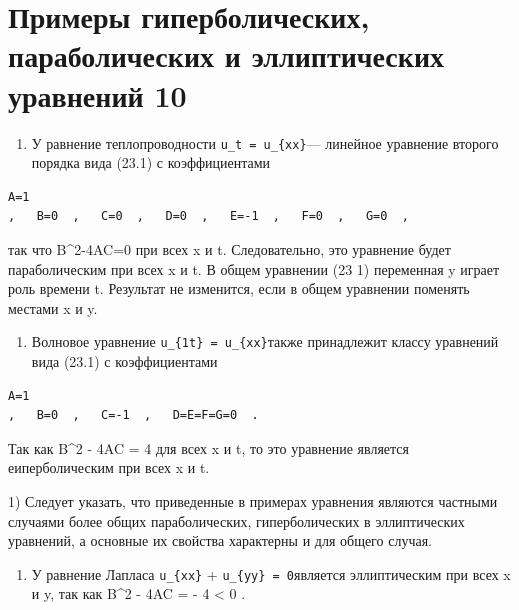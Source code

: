 \documentclass[
  ukrainian,
]{article}
\providecommand{\tightlist}{%
  \setlength{\itemsep}{0pt}\setlength{\parskip}{0pt}}
\begin{document}
\section{Примеры гиперболических, параболических и эллиптических
уравнений
10}\label{ux43fux440ux438ux43cux435ux440ux44b-ux433ux438ux43fux435ux440ux431ux43eux43bux438ux447ux435ux441ux43aux438ux445-ux43fux430ux440ux430ux431ux43eux43bux438ux447ux435ux441ux43aux438ux445-ux438-ux44dux43bux43bux438ux43fux442ux438ux447ux435ux441ux43aux438ux445-ux443ux440ux430ux432ux43dux435ux43dux438ux439-10}

\begin{enumerate}
\def\labelenumi{\arabic{enumi}.}
\tightlist
\item
  У равнение теплопроводности \texttt{u\_t\ =\ u\_\{xx\}}--- линейное
  уравнение второго порядка вида (23.1) с коэффициентами
\end{enumerate}

\begin{verbatim}
A=1
,   B=0  ,   C=0  ,   D=0  ,   E=-1  ,   F=0  ,   G=0  ,
\end{verbatim}

так что B\^{}2-4AC=0 при всех x и t. Следовательно, это уравнение будет
параболическим при всех x и t. В общем уравнении (23 1) переменная y
играет роль времени t. Результат не изменится, если в общем уравнении
поменять местами x и y.

\begin{enumerate}
\def\labelenumi{\arabic{enumi}.}
\setcounter{enumi}{1}
\tightlist
\item
  Волновое уравнение \texttt{u\_\{1t\}\ =\ u\_\{xx\}}также принадлежит
  классу уравнений вида (23.1) с коэффициентами
\end{enumerate}

\begin{verbatim}
A=1
,   B=0  ,   C=-1  ,   D=E=F=G=0  .
\end{verbatim}

Так как B\^{}2 - 4AC = 4 для всех x и t, то это уравнение является
еиперболическим при всех x и t.

1) Следует указать, что приведенные в примерах уравнения являются
частными случаями более общих параболических, гиперболических в
эллиптических уравнений, а основные их свойства характерны и для общего
случая.

\begin{enumerate}
\def\labelenumi{\arabic{enumi}.}
\setcounter{enumi}{2}
\tightlist
\item
  У равнение Лапласа \texttt{u\_\{xx\}} +
  \texttt{u\_\{yy\}\ =\ 0}является эллиптическим при всех x и y, так как
  B\^{}2 - 4AC = - 4 \textless{} 0 .
\end{enumerate}
\end{document}
